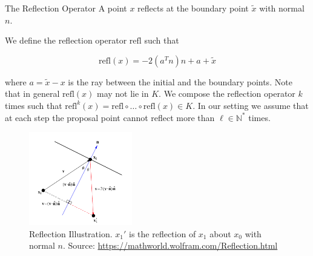 \documentclass[10pt]{beamer}
\begin{document}
\begin{frame}[allowframebreaks]{The Reflection Operator}
    A point $x$ reflects at the boundary point $\tilde x$ with normal $n$.
    
    \medskip
    
    We define the reflection operator $\textrm{refl}$ such that 
    
    $$
    \textrm{refl}(x) = - 2 (a^T n) n + a + \tilde x
    $$

    where $a = \tilde x - x$ is the ray between the initial and the boundary points. Note that in general $\textrm{refl}(x)$ may not lie in $K$. We compose the reflection operator $k$ times such that $\textrm{refl}^k (x) = \mathrm {refl} \circ \dots \circ \mathrm{refl} (x) \in K$. In our setting we assume that at each step the proposal point cannot reflect more than $\ell \in \mathbb N^*$ times.

    \framebreak 
    
    \begin{figure}
        \centering
        \includegraphics[width=0.4\textwidth]{publications/presentations/log_concave_sampling/reflection_w.png}
        \caption{Reflection Illustration. $x_1'$ is the reflection of $x_1$ about $x_0$ with normal $n$. Source: \url{https://mathworld.wolfram.com/Reflection.html}}
        \label{fig:my_label}
    \end{figure}
    
\end{frame}
\end{document}
